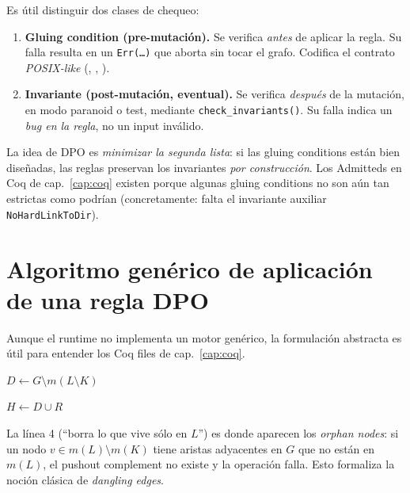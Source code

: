 Es útil distinguir dos clases de chequeo:

\begin{enumerate}
  \item \textbf{Gluing condition (pre-mutación).} Se verifica
    \emph{antes} de aplicar la regla. Su falla resulta en un
    \texttt{Err(\dots)} que aborta sin tocar el grafo. Codifica el
    contrato \emph{POSIX-like} (\eexist, \enoent, \enotempty).
  \item \textbf{Invariante (post-mutación, eventual).} Se verifica
    \emph{después} de la mutación, en modo paranoid o test, mediante
    \texttt{check\_invariants()}. Su falla indica un \emph{bug en la
    regla}, no un input inválido.
\end{enumerate}

La idea de DPO es \emph{minimizar la segunda lista}: si las gluing
conditions están bien diseñadas, las reglas preservan los invariantes
\emph{por construcción}. Los Admitteds en Coq de cap.~\ref{cap:coq}
existen porque algunas gluing conditions no son aún tan estrictas como
podrían (concretamente: falta el invariante auxiliar
\texttt{NoHardLinkToDir}).

\section{Algoritmo genérico de aplicación de una regla DPO}

Aunque el runtime no implementa un motor genérico, la formulación
abstracta es útil para entender los Coq files de cap.~\ref{cap:coq}.

\begin{algorithm}[H]
\SetAlgoLined
{}
\caption{\textsc{ApplyDPO}}
\label{alg:apply-dpo}


$D \gets G \setminus m(L \setminus K)$\;

$H \gets D \cup R$\;
\;
\end{algorithm}

La línea 4 (``borra lo que vive sólo en $L$'') es donde aparecen los
\emph{orphan nodes}: si un nodo $v \in m(L) \setminus m(K)$ tiene
aristas adyacentes en $G$ que no están en $m(L)$, el pushout
complement no existe y la operación falla. Esto formaliza la noción
clásica de \emph{dangling edges}.

